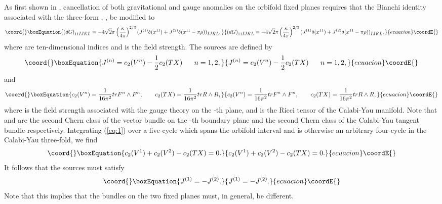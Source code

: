 \documentclass[a4paper,12pt]{article}
\numberwithin{equation}{section}
\theoremstyle{plain}
\begin{document}
As first shown in \cite{HW}, cancellation of both gravitational and gauge anomalies
on the orbifold fixed planes requires that the Bianchi identity associated
with the three-form \coordHE{}, \coordHE{}, be modified to
%
\begin{equation}\coord{}\boxEquation{
(dG)_{11\bar{I}\bar{J}\bar{K}\bar{L}}=-4\sqrt{2}\pi\left(\frac{\kappa}
{4\pi}\right)^{2/3}(J^{(1)}\delta(x^{11}) + J^{(2)}\delta(x^{11}-\pi\rho))_{\bar{I}
\bar{J}\bar{K}\bar{L}},
\label{eq:1}
}{
(dG)_{11\bar{I}\bar{J}\bar{K}\bar{L}}=-4\sqrt{2}\pi\left(\frac{\kappa}
{4\pi}\right)^{2/3}(J^{(1)}\delta(x^{11}) + J^{(2)}\delta(x^{11}-\pi\rho))_{\bar{I}
\bar{J}\bar{K}\bar{L}},
}{ecuacion}\coordE{}\end{equation}
%
where \coordHE{} are ten-dimensional indices and \coordHE{}
is the field strength. The sources are defined by
%
\begin{equation}\coord{}\boxEquation{
J^{(n)}= c_{2}(V^{n})-\frac{1}{2}c_{2}(TX) \;\;\;\;\;\; n=1,2,
\label{eq:2}
}{
J^{(n)}= c_{2}(V^{n})-\frac{1}{2}c_{2}(TX) \;\;\;\;\;\; n=1,2,
}{ecuacion}\coordE{}\end{equation}
%
and
%
\begin{equation}\coord{}\boxEquation{
c_{2}(V^{n})=\frac{1}{16\pi^{2}}trF^{n} \wedge F^{n}, \qquad
c_{2}(TX)=\frac{1}{16\pi^{2}}trR \wedge R,
\label{eq:3}
}{
c_{2}(V^{n})=\frac{1}{16\pi^{2}}trF^{n} \wedge F^{n}, \qquad
c_{2}(TX)=\frac{1}{16\pi^{2}}trR \wedge R,
}{ecuacion}\coordE{}\end{equation}
%
where \coordHE{} is the field strength associated with the gauge theory on the \coordHE{}-th plane, and \coordHE{} is the Ricci tensor of the Calabi-Yau manifold.
Note that \coordHE{} and \coordHE{} are the second Chern class of the
vector bundle on the \coordHE{}-th boundary plane and the second Chern class of the
Calabi-Yau tangent bundle respectively. Integrating (\ref{eq:1}) over a
five-cycle which spans the orbifold interval and is otherwise an arbitrary
four-cycle in the Calabi-Yau three-fold, we find
%
\begin{equation}\coord{}\boxEquation{
c_{2}(V^{1})+c_{2}(V^{2})-c_{2}(TX)=0.
\label{eq:4}
}{
c_{2}(V^{1})+c_{2}(V^{2})-c_{2}(TX)=0.
}{ecuacion}\coordE{}\end{equation}
%
It follows that the sources must satisfy
%
\begin{equation}\coord{}\boxEquation{
J^{(1)}=-J^{(2)}.
\label{eq:5}
}{
J^{(1)}=-J^{(2)}.
}{ecuacion}\coordE{}\end{equation}
%
Note that this implies that the bundles on the two fixed planes must, in
general, be different.
\end{document}
